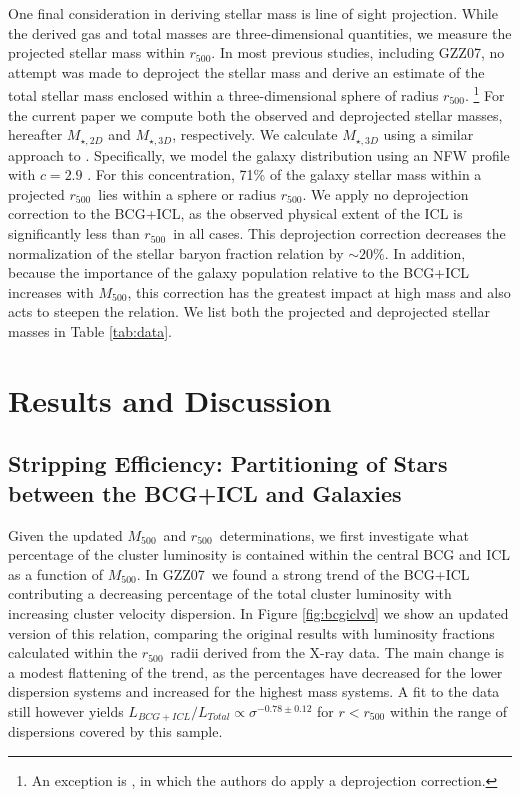 \documentclass[preprint]{emulateapj}
\newcommand\rfive{$r_{500}$}
\newcommand\ptwo{GZZ07}
\newcommand\mfive{${M}_{500}$}
\begin{document}
One final consideration in deriving stellar mass is line of sight
projection. While the derived gas and total masses are
three-dimensional quantities, we measure the projected stellar mass
within \rfive.  In most previous studies, including \ptwo, no attempt
was made to deproject the stellar mass and derive an estimate of the
total stellar mass enclosed within a three-dimensional sphere of
radius \rfive. {\footnote{An exception is \citet{giodini2009}, in which the
authors do apply a deprojection correction.}}   For the current paper we compute both the observed and
deprojected stellar masses, hereafter $M_{\star,2D}$ and
$M_{\star,3D}$, respectively. We calculate $M_{\star,3D}$ using a
similar approach to \citet{sanderson2013}.  Specifically, we model the
galaxy distribution using an NFW profile with $c=2.9$
\citep{lin2004a}. For this concentration, 71\% of the galaxy stellar
mass within a projected \rfive\ lies within a sphere or radius
\rfive. We apply no deprojection correction to the BCG+ICL, as the
observed physical extent of the ICL is significantly less than \rfive\
in all cases. This deprojection correction decreases the normalization
of the stellar baryon fraction relation by $\sim20$\%. In addition,
because the importance of the galaxy population relative to the
BCG+ICL increases with \mfive, this correction has the greatest impact
at high mass and also acts to steepen the relation.  We list both the
projected and deprojected stellar masses in Table \ref{tab:data}.


\section{Results and Discussion}
\label{sec:results}
\subsection{Stripping Efficiency: Partitioning of Stars between the BCG+ICL and Galaxies}

Given the updated \mfive\ and \rfive\ determinations, we first
investigate what percentage of the cluster luminosity is contained
within the central BCG and ICL as a function of \mfive. In \ptwo\ we
found a strong trend of the BCG+ICL contributing a decreasing
percentage of the total cluster luminosity with increasing cluster
velocity dispersion. In Figure \ref{fig:bcgiclvd} we show an updated
version of this relation, comparing the original results with
luminosity fractions calculated within the \rfive\ radii derived from
the X-ray data.  The main change is a modest flattening of the trend,
as the percentages have decreased for the lower dispersion systems and
increased for the highest mass systems.  A fit to the data still
however yields $L_{BCG+ICL}/L_{Total}\propto \sigma^{-0.78\pm0.12}$
for $r<r_{500}$ within the range of dispersions covered by this
sample.
\end{document}
